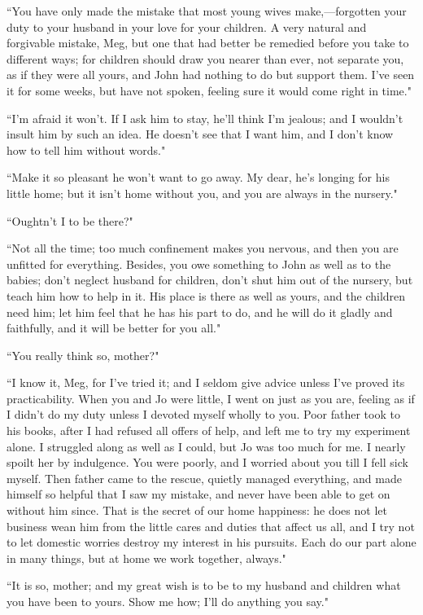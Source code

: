 ``You have only made the mistake that most young wives make,---forgotten
your duty to your husband in your love for your children. A very natural
and forgivable mistake, Meg, but one that had better be remedied before
you take to different ways; for children should draw you nearer than
ever, not separate you, as if they were all yours, and John had nothing
to do but support them. I've seen it for some weeks, but
have not spoken, feeling sure it would come right in time."

``I'm afraid it won't. If I ask him to
stay, he'll think I'm jealous; and I
wouldn't insult him by such an idea. He
doesn't see that I want him, and I don't
know how to tell him without words."

``Make it so pleasant he won't want to go away. My dear,
he's longing for his little home; but it
isn't home without you, and you are always in the
nursery."

``Oughtn't I to be there?"

``Not all the time; too much confinement makes you nervous, and then you
are unfitted for everything. Besides, you owe something to John as well
as to the babies; don't neglect husband for children,
don't shut him out of the nursery, but teach him how to
help in it. His place is there as well as yours, and the children need
him; let him feel that he has his part to do, and he will do it gladly
and faithfully, and it will be better for you all."

``You really think so, mother?"

``I know it, Meg, for I've tried it; and I seldom give
advice unless I've proved its practicability. When you
and Jo were little, I went on just as you are, feeling as if I
didn't do my duty unless I devoted myself wholly to you.
Poor father took to his books, after I had refused all offers of help,
and left me to try my experiment alone. I struggled along as well as I
could, but Jo was too much for me. I nearly spoilt her by indulgence.
You were poorly, and I worried about you till I fell sick myself. Then
father came to the rescue, quietly managed everything, and made himself
so helpful that I saw my mistake, and never have been able to get on
without him since. That is the secret of our home happiness: he does not
let business wean him from the little cares and duties that affect us
all, and I try not to let domestic worries destroy my interest in his
pursuits. Each do our part alone in many things, but at home we work
together, always."

``It is so, mother; and my great wish is to be to my husband and children
what you have been to yours. Show me how; I'll do
anything you say."

